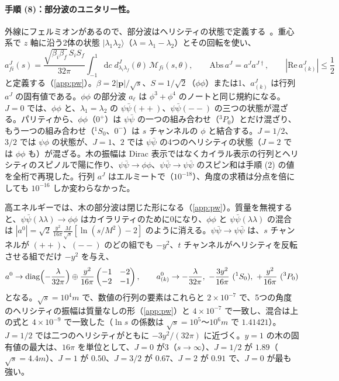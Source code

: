 \documentclass[a4paper,10pt]{ltjsarticle}
\newcommand{\dd}{\mathrm{d}}
\begin{document}
\paragraph{手順 (8)：部分波のユニタリー性。}外線にフェルミオンがあるので、部分波はヘリシティの状態で定義する~\cite{jw}。重心系で $z$ 軸に沿う2体の状態 $|\lambda_1\lambda_2\rangle$（$\lambda=\lambda_1-\lambda_2$）とその回転を使い、
\begin{equation}
a^J_{fi}(s)=\frac{\sqrt{\beta_i\beta_f}\,S_iS_f}{32\pi}\int_{-1}^{1}\!\dd c\;d^J_{\lambda_i\lambda_f}(\theta)\,\mathcal M_{fi}(s,\theta),\qquad
\mathrm{Abs}\,a^J=a^Ja^{J\dagger},\qquad|\mathrm{Re}\,a^J_{(k)}|\le\frac12
\label{eq:pw}
\end{equation}
と定義する（\ref{app:pw}）。$\beta=2|\boldsymbol p|/\sqrt s$、$S=1/\sqrt2$（$\phi\phi$）または1、$a^J_{(k)}$ は行列 $a^J$ の固有値である。$\phi\phi$ の部分波 $a_\ell$ は $\phi^3+\phi^4$ のノートと同じ規約になる。$J=0$ では、$\phi\phi$ と、$\lambda_1=\lambda_2$ の $\psi\bar\psi(++)$、$\psi\bar\psi(--)$ の三つの状態が混ざる。パリティから、$\phi\phi$（$0^+$）は $\psi\bar\psi$ の一つの組み合わせ（${}^3P_0$）とだけ混ざり、もう一つの組み合わせ（${}^1S_0$、$0^-$）は $s$ チャンネルの $\phi$ と結合する。$J=1/2$、$3/2$ では $\psi\phi$ の状態が、$J=1$、$2$ では $\psi\bar\psi$ の4つのヘリシティの状態（$J=2$ では $\phi\phi$ も）が混ざる。木の振幅は Dirac 表示ではなくカイラル表示の行列とヘリシティのスピノルで陽に作り、$\psi\bar\psi\to\phi\phi$、$\psi\bar\psi\to\psi\bar\psi$ のスピン和は手順 (2) の値を全桁で再現した。行列 $a^J$ はエルミートで（$10^{-18}$）、角度の求積は分点を倍にしても $10^{-16}$ しか変わらなかった。

高エネルギーでは、木の部分波は閉じた形になる（\ref{app:pw}）。質量を無視すると、$\psi\bar\psi(\lambda\lambda)\to\phi\phi$ はカイラリティのために0になり、$\phi\phi$ と $\psi\bar\psi(\lambda\lambda)$ の混合は $|a^0|=\sqrt2\,\frac{y^2}{16\pi}\frac{M}{\sqrt s}[\ln(s/M^2)-2]$ のように消える。$\psi\bar\psi\to\psi\bar\psi$ は、$s$ チャンネルが $(++)$、$(--)$ のどの組でも $-y^2$、$t$ チャンネルがヘリシティを反転させる組でだけ $-y^2$ を与え、
\begin{equation*}
a^0\to\mathrm{diag}\Bigl(-\frac{\lambda}{32\pi}\Bigr)\oplus\frac{y^2}{16\pi}\begin{pmatrix}-1&-2\\-2&-1\end{pmatrix},\qquad
a^0_{(k)}\to-\frac{\lambda}{32\pi},\ -\frac{3y^2}{16\pi}\ ({}^1S_0),\ +\frac{y^2}{16\pi}\ ({}^3P_0)
\end{equation*}
となる。$\sqrt s=10^4m$ で、数値の行列の要素はこれらと $2\times10^{-7}$ で、5つの角度のヘリシティの振幅は質量なしの形（\ref{app:pw}）と $4\times10^{-7}$ で一致し、混合は上の式と $4\times10^{-9}$ で一致した（$\ln s$ の係数は $\sqrt s=10^5$〜$10^6m$ で $1.41421$）。$J=1/2$ では二つのヘリシティがともに $-3y^2/(32\pi)$ に近づく。$y=1$ の木の固有値の最大は、$16\pi$ を単位として、$J=0$ が3（$s\to\infty$）、$J=1/2$ が $1.89$（$\sqrt s=4.4m$）、$J=1$ が $0.50$、$J=3/2$ が $0.67$、$J=2$ が $0.91$ で、$J=0$ が最も強い。
\end{document}
